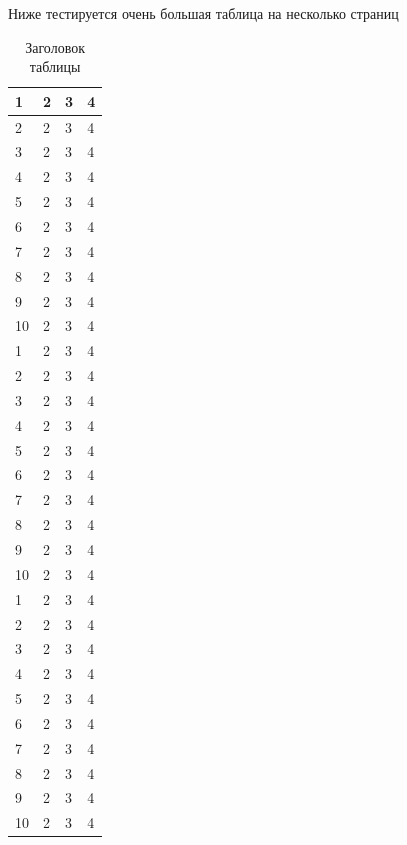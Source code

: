 \documentclass[a4paper,14pt]{extarticle}
\begin{document}
Ниже тестируется очень большая таблица на несколько страниц

\begin{center}
    \begin{longtable}{|p{2cm}|p{3cm}|p{7cm}|p{3cm}|}
    \caption{Заголовок таблицы}\\
    \hline
    1 & 2 & 3 & 4\\ 
    \hline 
    2 & 2 & 3 & 4\\
    \hline
    3 & 2 & 3 & 4\\
    \hline
    4 & 2 & 3 & 4\\
    \hline
    5 & 2 & 3 & 4\\
    \hline
    6 & 2 & 3 & 4\\
    \hline
    7 & 2 & 3 & 4\\
    \hline
    8 & 2 & 3 & 4\\
    \hline
    9 & 2 & 3 & 4\\
    \hline
    10 & 2 & 3 & 4\\
    \hline
    1 & 2 & 3 & 4\\ 
    \hline 
    2 & 2 & 3 & 4\\
    \hline
    3 & 2 & 3 & 4\\
    \hline
    4 & 2 & 3 & 4\\
    \hline
    5 & 2 & 3 & 4\\
    \hline
    6 & 2 & 3 & 4\\
    \hline
    7 & 2 & 3 & 4\\
    \hline
    8 & 2 & 3 & 4\\
    \hline
    9 & 2 & 3 & 4\\
    \hline
    10 & 2 & 3 & 4\\
    \hline
    1 & 2 & 3 & 4\\ 
    \hline 
    2 & 2 & 3 & 4\\
    \hline
    3 & 2 & 3 & 4\\
    \hline
    4 & 2 & 3 & 4\\
    \hline
    5 & 2 & 3 & 4\\
    \hline
    6 & 2 & 3 & 4\\
    \hline
    7 & 2 & 3 & 4\\
    \hline
    8 & 2 & 3 & 4\\
    \hline
    9 & 2 & 3 & 4\\
    \hline
    10 & 2 & 3 & 4\\
    \hline
    
    
    \end{longtable}
\end{center}
\end{document}
